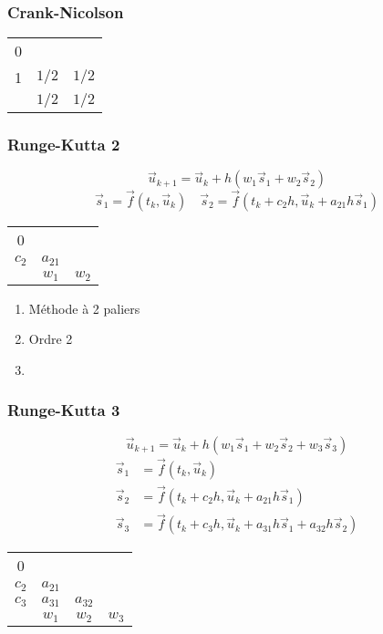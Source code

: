 \documentclass[resume]{subfiles}
\begin{document}
\subsubsection{Crank-Nicolson}
\begin{table}[H]
\centering
\begin{tabular}{c|cc}
0 & \\
1 & $1/2$ & $1/2$\\\hline
 & $1/2$ & $1/2$
\end{tabular}
\end{table}
\subsubsection{Runge-Kutta 2}
$$\boxed{\vec{u}_{k+1}=\vec{u}_k+h\left(w_1\vec{s}_1+w_2\vec{s}_2\right)}$$
$$\boxed{\vec{s}_1=\vec{f}(t_k,\vec{u}_k)\quad\vec{s}_2=\vec{f}(t_k+c_2h,\vec{u}_k+a_{21}h\vec{s}_1)}$$
\begin{table}[H]
\centering
\begin{tabular}{c|cc}
0 & \\
$c_2$ & $a_{21}$\\\hline
 & $w_1$ & $w_2$
\end{tabular}
\end{table}
\begin{enumerate}
\item Méthode à 2 paliers
\item Ordre 2
\item 
\end{enumerate}
\subsubsection{Runge-Kutta 3}
$$\boxed{\vec{u}_{k+1}=\vec{u}_k+h\left(w_1\vec{s}_1+w_2\vec{s}_2+w_3\vec{s}_3\right)}$$
\begin{align*}
\vec{s}_1&=\vec{f}(t_k,\vec{u}_k)\\
\vec{s}_2&=\vec{f}(t_k+c_2h,\vec{u}_k+a_{21}h\vec{s}_1)\\
\vec{s}_3&=\vec{f}(t_k+c_3h,\vec{u}_k+a_{31}h\vec{s}_1+a_{32}h\vec{s}_2)
\end{align*}
\begin{table}[H]
\centering
\begin{tabular}{c|ccc}
0 & \\
$c_2$ & $a_{21}$\\
$c_3$ & $a_{31}$ & $a_{32}$\\\hline
 & $w_1$ & $w_2$ & $w_3$
\end{tabular}
\end{table}
\end{document}
